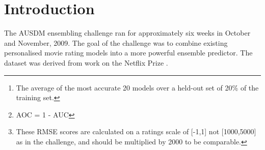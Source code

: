 \documentclass{article}
\begin{document}
 


\begin{abstract} 

Up to 1151 ``black box'' movie recommendation models were combined into an ensemble predictor.  Significant success was achieved on the binary AUC task, using a deep neural network, a gated classifier and multiple logistic regression.  Further improvement was achieved by adding hand-coded features, and by modelling the joint distribution of the movie models using a SVD and denoising auto-encoders.

On the large AUC task, the baseline\footnote{The average of the most accurate 20 models over a held-out set of 20\% of the training set.}  AOC\footnote{AOC = 1 - AUC} performance of 0.1635 was improved to 0.1461.  On the more difficult medium task, the baseline performance of 0.3384 was improved to 0.3144, and on the small task, the already low baseline of 0.0597 was slightly improved to 0.0571.

Less success was achieved on the regression RMSE task.  The best result, on the large task, reduced the baseline of 0.4419 to 0.4385\footnote{These RMSE scores are calculated on a ratings scale of [-1,1] not [1000,5000] as in the challenge, and should be multiplied by 2000 to be comparable.}.

The ``black box'' nature of the challenge and the underlying noise in the labels (to which the RMSE score is particularly sensitive) make progress difficult.  An alternative framework for ensembling is discussed which, whilst placing more requirements on model builders, would likely lead to better improvement in the ensembles.

\end{abstract}

\section{Introduction}

The AUSDM ensembling challenge ran for approximately six weeks in October and November, 2009.  The goal of the challenge was to combine existing personalised movie rating models into a more powerful ensemble predictor.  The dataset was derived from work on the Netflix Prize \cite{NetFlixPrize}.
\end{document}
